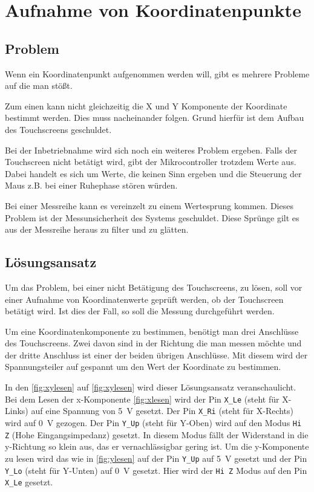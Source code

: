 \chapter{Aufnahme von Koordinatenpunkte}
\section{Problem}
Wenn ein Koordinatenpunkt aufgenommen werden will, gibt es mehrere Probleme auf die man stößt.

Zum einen kann nicht gleichzeitig die X und Y Komponente der Koordinate bestimmt werden. Dies muss nacheinander folgen.
Grund hierfür ist dem Aufbau des Touchscreens geschuldet.

Bei der Inbetriebnahme wird sich noch ein weiteres Problem ergeben.
Falls der Touchscreen nicht betätigt wird, gibt der Mikrocontroller trotzdem Werte aus.
Dabei handelt es sich um Werte, die keinen Sinn ergeben und die Steuerung der Maus z.B. bei einer Ruhephase stören würden.

Bei einer Messreihe kann es vereinzelt zu einem Wertesprung kommen. 
Dieses Problem ist der Messunsicherheit des Systems geschuldet. 
Diese Sprünge gilt es aus der Messreihe heraus zu filter und zu glätten.

\section{Lösungsansatz}
Um das Problem, bei einer nicht Betätigung des Touchscreens, zu lösen, soll vor einer Aufnahme von Koordinatenwerte geprüft werden, ob der Touchscreen betätigt wird.
Ist dies der Fall, so soll die Messung durchgeführt werden.

Um eine Koordinatenkomponente zu bestimmen, benötigt man drei Anschlüsse des Touchscreens.
Zwei davon sind in der Richtung die man messen möchte und der dritte Anschluss ist einer der beiden übrigen Anschlüsse.
Mit diesem wird der Spannungsteiler auf gespannt um den Wert der Koordinate zu bestimmen.

In den \cref{fig:xylesen} auf \cref{fig:xylesen} wird dieser Lösungsansatz veranschaulicht.
Bei dem Lesen der x-Komponente \cref{fig:xlesen} wird der Pin \verb$X_Le$ (steht für X-Links) auf eine Spannung von \SI{5}{V} gesetzt.
Der Pin \verb$X_Ri$ (steht für X-Rechts) wird auf \SI{0}{V} gezogen.
Der Pin  \verb$Y_Up$ (steht für Y-Oben) wird auf den Modus \verb$Hi Z$ (Hohe Eingangsimpedanz) gesetzt. In diesem Modus fällt der Widerstand in die y-Richtung so klein aus, das er vernachlässigbar gering ist.
Um die y-Komponente zu lesen wird das wie in \cref{fig:ylesen} auf  der Pin \verb$Y_Up$ auf \SI{5}{V} gesetzt und der Pin \verb$Y_Lo$ (steht für Y-Unten) auf \SI{0}{V} gesetzt.
Hier wird der \verb$Hi Z$ Modus auf den Pin \verb$X_Le$ gesetzt.

